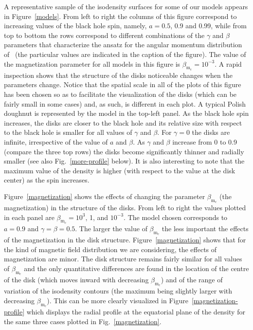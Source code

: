 \documentclass{aa}
\begin{document}
A representative sample of the isodensity surfaces for some of our models appears in Figure~\ref{models}. From left to right the columns of this figure correspond to increasing values of the black hole spin, namely, $a=0.5$, 0.9 and 0.99, while from top to bottom the rows correspond to different combinations of the $\gamma$ and $\beta$ parameters that characterize the ansatz for the angular momentum distribution of~\citet{Qian:2009} (the particular values are indicated in the caption of the figure). The value of the magnetization parameter for all models in this figure is $\beta_{\mathrm{m}_{\mathrm{c}}}
=10^{-3}$. A rapid inspection shows that the structure of the disks noticeable changes when the parameters change. Notice that the spatial scale in all of the plots of this figure has been chosen so as to facilitate the visualization of the disks (which can be fairly small in some cases) and, as such, is different in each plot. A typical Polish doughnut is represented by the model in the top-left panel. As the black hole spin increases, the disks are closer to the black hole and its relative size with respect to the black hole is smaller for all values of $\gamma$ and $\beta$. For $\gamma=0$ the disks are infinite, irrespective of the value of $a$ and $\beta$. As $\gamma$ and $\beta$ increase from 0 to 0.9 (compare the three top rows) the disks become significantly thinner and radially smaller (see also Fig.~\ref{more-profile} below). It is also interesting to note that the maximum value of the density is higher (with respect to the value at the disk center) as the spin increases.

Figure~\ref{magnetization} shows the effects of changing the parameter $\beta_{\mathrm{m}_{\mathrm{c}}}
$ (the magnetization) in the structure of the disks. From left to right the values plotted in each panel are $\beta_{\mathrm{m}_{\mathrm{c}}}
=10^3$, 1, and $10^{-3}$. The model chosen corresponds to $a=0.9$ and $\gamma=\beta=0.5$. The larger the value of $\beta_{\mathrm{m}_{\mathrm{c}}}
$ the less important the effects of the magnetization in the disk structure. Figure~\ref{magnetization} shows that for the kind of magnetic field distribution we are considering, the effects of magnetization are minor. The disk structure remains fairly similar for all values of $\beta_{\mathrm{m}_{\mathrm{c}}}
$ and the only quantitative differences are found in the location of the centre of the disk (which moves inward with decreasing $\beta_{\mathrm{m}_{\mathrm{c}}}
$) and of the range of variation of the isodensity contours (the maximum being slightly larger with decreasing $\beta_{\mathrm{m}_{\mathrm{c}}}
$). This can be more clearly visualized in Figure~\ref{magnetization-profile} which displays the radial profile at the equatorial plane of the density for the same three cases plotted in Fig.~\ref{magnetization}.
\end{document}
